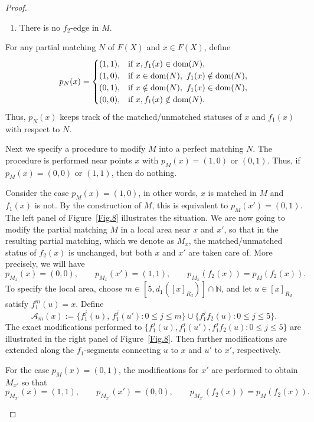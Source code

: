 \documentclass[11pt, reqno, a4paper]{amsart}
\theoremstyle{definition}
\theoremstyle{plain}
\newcommand{\dom}{\text{\rm dom}}
\begin{document}
\begin{proof}
\begin{enumerate}[label=\roman*),leftmargin=2.7em]
\item There is no $f_2$-edge in $M$.
\end{enumerate}

For any partial matching $N$ of $F(X)$ and $x\in F(X)$, define
$$
p_N(x)=
\begin{cases}
(1,1), & \text{if } x,f_1(x)\in \dom(N),\\
(1,0), & \text{if } x\in\dom(N),\ f_1(x)\notin\dom(N),\\
(0,1), & \text{if } x\notin\dom(N),\ f_1(x)\in\dom(N),\\
(0,0), & \text{if } x,f_1(x)\notin\dom(N).
\end{cases}
$$
Thus, $p_N(x)$ keeps track of the matched/unmatched statuses of $x$ and $f_1(x)$ with respect to $N$. 

Next we specify a procedure to modify $M$ into a perfect matching $N$. The procedure is performed near points $x$ with $p_M(x)=(1,0)$ or $(0,1)$. Thus, if $p_M(x)=(0,0)$ or $(1,1)$, then do nothing. 

Consider the case $p_M(x)=(1,0)$, in other words, $x$ is matched in $M$ and $f_1(x)$ is not. 
By the construction of $M$, this is equivalent to
$p_M(x')=(0,1)$. The left panel of Figure~\ref{Fig.8} illustrates the situation.
We are now going to modify the partial matching $M$ in a local area near $x$ and $x'$, so that in the resulting partial matching, which we denote as $M_x$, the matched/unmatched status of $f_2(x)$ is unchanged, but both $x$ and $x'$ are taken care of.  More precisely, we will have $$
p_{M_x}(x)=(0,0),\qquad
p_{M_x}(x')=(1,1),\qquad 
p_{M_x}(f_2(x))=p_M(f_2(x)).
$$
To specify the local area, choose $m\in [5,d_1([x]_{R_d})]\cap \mathbb{N}$,
and let $u\in [x]_{R_d}$ satisfy
$f_1^m(u)=x$.
Define
$$
\mathcal A_m(x)
   :=\{f_1^j(u),\,f_1^j(u')\colon 0\leq j\leq m\}\cup \{f_1^jf_2(u)\colon 0\le j\le 5\}.
$$
The exact modifications performed to $\{f_1^j(u), f_1^j(u'), f_1^jf_2(u)\colon 0\leq j\leq 5\}$ are illustrated in the right panel of Figure~\ref{Fig.8}. Then further modifications are extended along the $f_1$-segments connecting $u$ to $x$ and $u'$ to $x'$, respectively.

For the case $p_M(x)=(0,1)$, the modifications for $x'$ are performed to obtain $M_{x'}$ so that
$$
p_{M_{x'}}(x)=(1,1),\qquad
p_{M_{x'}}(x')=(0,0),\qquad
p_{M_{x'}}(f_2(x))=p_M(f_2(x)).
$$

\begin{figure}[H]
    \centering




\end{figure}
\end{proof}
\end{document}
